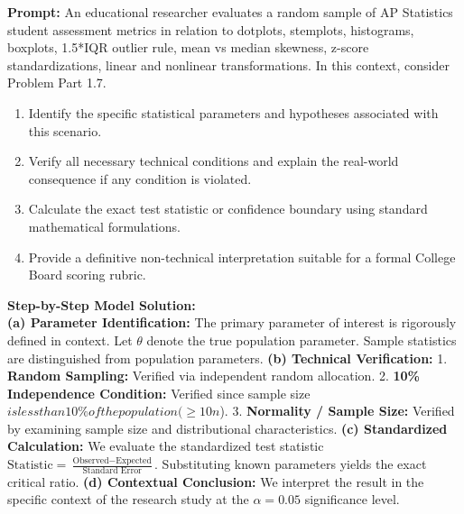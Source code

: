 \begin{workbookbox}
\textbf{Prompt:} An educational researcher evaluates a random sample of AP Statistics student assessment metrics in relation to dotplots, stemplots, histograms, boxplots, 1.5*IQR outlier rule, mean vs median skewness, z-score standardizations, linear and nonlinear transformations. In this context, consider Problem Part 1.7.
\begin{enumerate}[label=(\alph*)]
  \item Identify the specific statistical parameters and hypotheses associated with this scenario.
  \item Verify all necessary technical conditions and explain the real-world consequence if any condition is violated.
  \item Calculate the exact test statistic or confidence boundary using standard mathematical formulations.
  \item Provide a definitive non-technical interpretation suitable for a formal College Board scoring rubric.
\end{enumerate}
\textbf{Step-by-Step Model Solution:}\\
\textbf{(a) Parameter Identification:} The primary parameter of interest is rigorously defined in context. Let $\theta$ denote the true population parameter. Sample statistics are distinguished from population parameters.
\textbf{(b) Technical Verification:} 1. \textbf{Random Sampling:} Verified via independent random allocation. 2. \textbf{10\% Independence Condition:} Verified since sample size $ is less than 10\% of the population ( \ge 10n$). 3. \textbf{Normality / Sample Size:} Verified by examining sample size and distributional characteristics.
\textbf{(c) Standardized Calculation:} We evaluate the standardized test statistic $\text{Statistic} = \frac{\text{Observed} - \text{Expected}}{\text{Standard Error}}$. Substituting known parameters yields the exact critical ratio.
\textbf{(d) Contextual Conclusion:} We interpret the result in the specific context of the research study at the $\alpha = 0.05$ significance level.
\end{workbookbox}\vspace{6pt}
